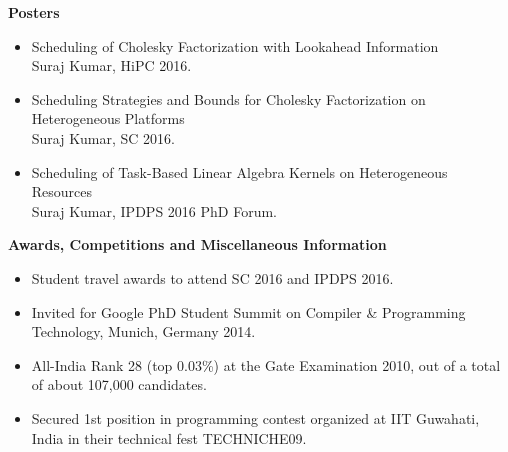 \documentclass[letterpaper,11pt]{article}
\newcommand{\resheading}[1]{{\large \colorbox{mygrey}{\begin{minipage}{\textwidth}{\textbf{#1 \vphantom{p\^{E}}}}\end{minipage}}}}
\begin{document}
\vspace*{0.2in}

\resheading{Posters}
\begin{itemize}
	\item Scheduling of Cholesky Factorization with Lookahead Information\\
	Suraj Kumar, HiPC 2016.
	\item Scheduling Strategies and Bounds for Cholesky Factorization on Heterogeneous Platforms\\
	Suraj Kumar, SC 2016.
	\item Scheduling of Task-Based Linear Algebra Kernels on Heterogeneous Resources\\
	Suraj Kumar, IPDPS 2016 PhD Forum.
\end{itemize}
\vspace{0.1in}
\resheading{Awards, Competitions and Miscellaneous Information}
\begin{itemize}
	\item Student travel awards to attend SC 2016 and IPDPS 2016.
	\item Invited for Google PhD Student Summit on Compiler \& Programming Technology, Munich, Germany 2014.
	\item {All-India Rank 28 (top 0.03\%) at the Gate Examination 2010, out of a total of about 107,000 candidates.}
	\item {Secured 1st position in programming contest organized at IIT Guwahati, India in their technical fest TECHNICHE09.}

\end{itemize}
\end{document}
